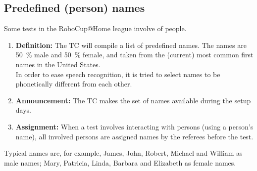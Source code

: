 \subsection{Predefined (person) names}\label{rule:scenario_names}

Some tests in the RoboCup@Home league involve  of people. 

\begin{enumerate}
	\item \textbf{Definition:} The TC will compile a list of \NumNames predefined names. The names are \SI{50}{\percent} male and \SI{50}{\percent} female, and taken from the (current) most common first names in the United States.\\
	In order to ease speech recognition, it is tried to select names to be phonetically different from each other.

	\item \textbf{Announcement:} The TC makes the set of names available during the setup days.
	\item \textbf{Assignment:} When a test involves interacting with persons (using a person's name), all involved persons are assigned names by the referees before the test. 
\end{enumerate}

Typical names are, for example, James, John, Robert, Michael and William as male names; Mary, Patricia, Linda, Barbara and Elizabeth as female names.



%


